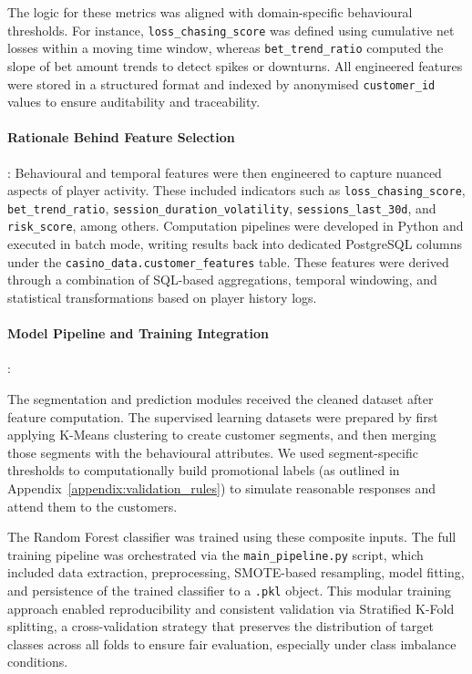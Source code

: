 \documentclass[12pt,a4paper]{report}
\begin{document}
The logic for these metrics was aligned with domain-specific behavioural thresholds. For instance, \texttt{loss\_chasing\_score} was defined using cumulative net losses within a moving time window, whereas \texttt{bet\_trend\_ratio} computed the slope of bet amount trends to detect spikes or downturns. All engineered features were stored in a structured format and indexed by anonymised \texttt{customer\_id} values to ensure auditability and traceability.
\vspace{0.5em}

\paragraph{Rationale Behind Feature Selection}:
Behavioural and temporal features were then engineered to capture nuanced aspects of player activity. These included indicators such as \texttt{loss\_chasing\_score}, \texttt{bet\_trend\_ratio}, \texttt{session\_duration\_volatility}, \texttt{sessions\_last\_30d}, and \texttt{risk\_score}, among others. Computation pipelines were developed in Python and executed in batch mode, writing results back into dedicated PostgreSQL columns under the \texttt{casino\_data.customer\_features} table. These features were derived through a combination of SQL-based aggregations, temporal windowing, and statistical transformations based on player history logs.



\paragraph{Model Pipeline and Training Integration}:
\label{sec:model_training}

The segmentation and prediction modules received the cleaned dataset after feature computation.  The supervised learning datasets were prepared by first applying K-Means clustering to create customer segments, and then merging those segments with the behavioural attributes.  We used segment-specific thresholds to computationally build promotional labels (as outlined in  Appendix~\ref{appendix:validation_rules}) to simulate reasonable responses and attend them to the customers.

The Random Forest classifier was trained using these composite inputs. The full training pipeline was orchestrated via the \texttt{main\_pipeline.py} script, which included data extraction, preprocessing, SMOTE-based resampling, model fitting, and persistence of the trained classifier to a \texttt{.pkl} object. This modular training approach enabled reproducibility and consistent validation via Stratified K-Fold splitting, a cross-validation strategy that preserves the distribution of target classes across all folds to ensure fair evaluation, especially under class imbalance conditions.
\end{document}
